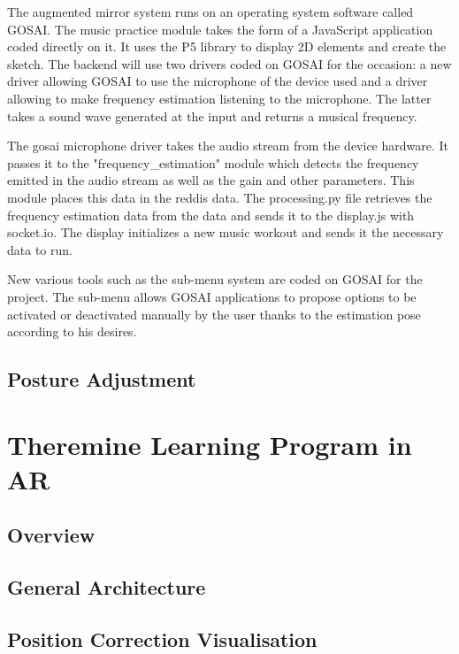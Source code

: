 The augmented mirror system runs on an operating system software called GOSAI. The music practice module takes the form of a JavaScript application coded directly on it. It uses the P5 library to display 2D elements and create the sketch. The backend will use two drivers coded on GOSAI for the occasion: a new driver allowing GOSAI to use the microphone of the device used and a driver allowing to make frequency estimation listening to the microphone. The latter takes a sound wave generated at the input and returns a musical frequency.

The gosai microphone driver takes the audio stream from the device hardware. It passes it to the "frequency_estimation" module which detects the frequency emitted in the audio stream as well as the gain and other parameters. This module places this data in the reddis data. The processing.py file retrieves the frequency estimation data from the data and sends it to the display.js with socket.io. The display initializes a new music workout and sends it the necessary data to run.

New various tools such as the sub-menu system are coded on GOSAI for the project. The sub-menu allows GOSAI applications to propose options to be activated or deactivated manually by the user thanks to the estimation pose according to his desires.

\subsection{Posture Adjustment}



\section{Theremine Learning Program in AR}

\subsection{Overview}


\subsection{General Architecture}


\subsection{Position Correction Visualisation}



